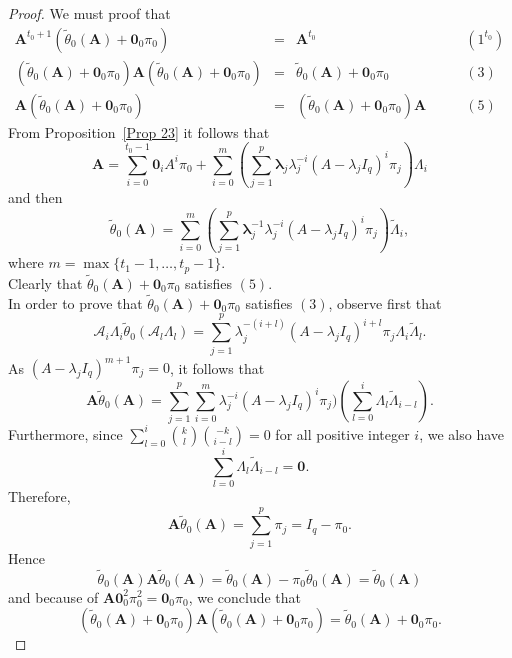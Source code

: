 \documentclass[12pt]{amsart}
\theoremstyle{definition}
\numberwithin{equation}{section}
\numberwithin{equation}{section}
\begin{document}
\begin{proof} We must proof that
$$\begin{array}{rrlc}
\pmb{A}^{t_{0}+1}(\widetilde{\theta}_{0}(\pmb{A})+\pmb{0}_{0}\pi_{0})&=&\pmb{A}^{t_{0}}\quad\quad &(1^{t_{0}})\\
(\widetilde{\theta}_{0}(\pmb{A})+\pmb{0}_{0}\pi_{0})\pmb{A}(\widetilde{\theta}_{0}(\pmb{A})+
\pmb{0}_{0}\pi_{0})&=&\widetilde{\theta}_{0}(\pmb{A})+\pmb{0}_{0}\pi_{0} \quad\quad &(3)\\
\pmb{A}(\widetilde{\theta}_{0}(\pmb{A})+\pmb{0}_{0}\pi_{0})&=&(\widetilde{\theta}_{0}(\pmb{A})+\pmb{0}_{0}\pi_{0})\pmb{A} \quad\quad &(5)
\end{array}$$
From Proposition~\ref{Prop 23} it follows that
$$\pmb{A}=\displaystyle\sum_{i=0}^{t_{0}-1}\pmb{0}_{i}A^{i}\pi_{0} + \sum_{i=0}^{m}(\sum_{j=1}^{p}\pmb{\lambda}_{j}\lambda_{j}^{-i}(A-\lambda_{j}I_{q})^{i}\pi_{j})\Lambda_{i}$$ and then $$\widetilde{\theta}_{0}(\pmb{A})=
\displaystyle\sum_{i=0}^{m}(\sum_{j=1}^{p}\pmb{\lambda}^{-1}_{j}\lambda_{j}^{-i}(A-\lambda_{j}I_{q})^{i}\pi_{j})
\widetilde{\Lambda}_{i},$$ where $m=\max\{t_{1}-1,\ldots,t_{p}-1\}$.
\\Clearly that $\widetilde{\theta}_{0}(\pmb{A})+\pmb{0}_{0}\pi_{0}$ satisfies $(5)$.
\\In order to prove that $\widetilde{\theta}_{0}(\pmb{A})+\pmb{0}_{0}\pi_{0}$ satisfies $(3)$, observe first that $$\mathcal{A}_{i}\Lambda_{i}\widetilde{\theta}_{0}(\mathcal{A}_{l}\Lambda_{l})=
\displaystyle\sum_{j=1}^{p}\lambda_{j}^{-(i+l)}(A-\lambda_{j}I_{q})^{i+l}\pi_{j}\Lambda_{i}\widetilde{\Lambda}_{l}.$$
As $(A-\lambda_{j}I_{q})^{m+1}\pi_{j}=0$, it follows that $$\pmb{A}\widetilde{\theta}_{0}(\pmb{A})=
\displaystyle\sum_{j=1}^{p}\sum_{i=0}^{m}\lambda_{j}^{-i}(A-\lambda_{j}I_{q})^{i}\pi_{j})
(\sum_{l=0}^{i}\Lambda_{l}\widetilde{\Lambda}_{i-l}).$$
Furthermore, since $\displaystyle\sum_{l=0}^{i}\binom{k}{l}\binom{-k}{i-l}=0$ for all positive integer $i$, we also have $$\displaystyle\sum_{l=0}^{i}\Lambda_{l}\widetilde{\Lambda}_{i-l}=\pmb{0}.$$
Therefore, $$\pmb{A}\widetilde{\theta}_{0}(\pmb{A})=\displaystyle\sum_{j=1}^{p}\pi_{j}=
I_{q}-\pi_{0}.$$ Hence $$\widetilde{\theta}_{0}(\pmb{A})\pmb{A}\widetilde{\theta}_{0}(\pmb{A})=\widetilde{\theta}_{0}(\pmb{A})-
\pi_{0}\widetilde{\theta}_{0}(\pmb{A})=
\widetilde{\theta}_{0}(\pmb{A})$$ and because of $\pmb{A}\pmb{0}_{0}^{2}\pi_{0}^{2}=\pmb{0}_{0}\pi_{0}$, we conclude that
$$(\widetilde{\theta}_{0}(\pmb{A})+\pmb{0}_{0}\pi_{0})\pmb{A}(\widetilde{\theta}_{0}(\pmb{A})+
\pmb{0}_{0}\pi_{0})=\widetilde{\theta}_{0}(\pmb{A})+\pmb{0}_{0}\pi_{0}.$$

\end{proof}
\end{document}
